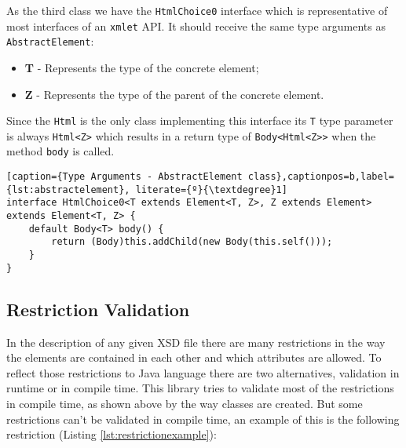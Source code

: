 \noindent
As the third class we have the \texttt{HtmlChoice0} interface which is representative of most interfaces of an \texttt{xmlet} \ac{API}. It should receive the same type arguments as \texttt{AbstractElement}:

\begin{itemize}
	\item \textbf{T} - Represents the type of the concrete element; 
	\item \textbf{Z} - Represents the type of the parent of the concrete element.
\end{itemize}	

\noindent
Since the \texttt{Html} is the only class implementing this interface its \texttt{T} type parameter is always \texttt{Html<Z>} which results in a return type of \texttt{Body<Html<Z>}\texttt{>} when the method \texttt{body} is called. 

\bigskip


\begin{minipage}{\linewidth}
\begin{lstlisting}[caption={Type Arguments - AbstractElement class},captionpos=b,label={lst:abstractelement}, literate={º}{\textdegree}1]
interface HtmlChoice0<T extends Element<T, Z>, Z extends Element> 		                                           extends Element<T, Z> {
    default Body<T> body() {
        return (Body)this.addChild(new Body(this.self()));
    }
}
\end{lstlisting}
\end{minipage}

\subsection{Restriction Validation}
\label{sec:restrictionvalidation}

In the description of any given \ac{XSD} file there are many restrictions in the way the elements are contained in each other and which attributes are allowed. To reflect those restrictions to Java language there are two alternatives, validation in runtime or in compile time. This library tries to validate most of the restrictions in compile time, as shown above by the way classes are created. But some restrictions can't be validated in compile time, an example of this is the following restriction (Listing \ref{lst:restrictionexample}):


